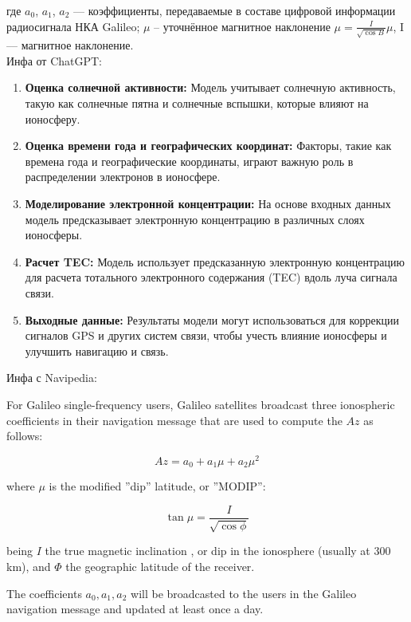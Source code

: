 \documentclass[14pt,a4paper,oneside]{extarticle}
\begin{document}
где $a_0$, $a_1$, $a_2$ –– коэффициенты, передаваемые в составе цифровой информации радиосигнала НКА Galileo; $\mu$ – уточнённое магнитное наклонение $\mu=\frac{I}{\sqrt{\cos B}}\mu $, I –– магнитное наклонение.\\


Инфа от ChatGPT:

\begin{enumerate}
    \item \textbf{Оценка солнечной активности:} Модель учитывает солнечную активность, такую как солнечные пятна и солнечные вспышки, которые влияют на ионосферу.
    
    \item \textbf{Оценка времени года и географических координат:} Факторы, такие как времена года и географические координаты, играют важную роль в распределении электронов в ионосфере.
    
    \item \textbf{Моделирование электронной концентрации:} На основе входных данных модель предсказывает электронную концентрацию в различных слоях ионосферы.
    
    \item \textbf{Расчет TEC:} Модель использует предсказанную электронную концентрацию для расчета тотального электронного содержания (TEC) вдоль луча сигнала связи.
    
    \item \textbf{Выходные данные:} Результаты модели могут использоваться для коррекции сигналов GPS и других систем связи, чтобы учесть влияние ионосферы и улучшить навигацию и связь.
  \end{enumerate}
  

Инфа с Navipedia:

For Galileo single-frequency users, Galileo satellites broadcast three ionospheric coefficients in their navigation message that are used to compute the $Az$ as follows:

\[Az=a_0+a_1\mu + a_2 \mu^2\]

where $\mu$ is the modified ''dip'' latitude, or ''MODIP'':

\[\tan \mu=\displaystyle \frac{I}{\sqrt{\cos \phi}}\]

being $\displaystyle{ I }$ the true magnetic inclination , or dip in the ionosphere (usually at 300 km), and $\displaystyle{ \Phi }$ the geographic latitude of the receiver.

The coefficients $\displaystyle{ a_0 }, \displaystyle{ a_1 },\displaystyle{ a_2 }$ will be broadcasted to the users in the Galileo navigation message and updated at least once a day.
\end{document}
